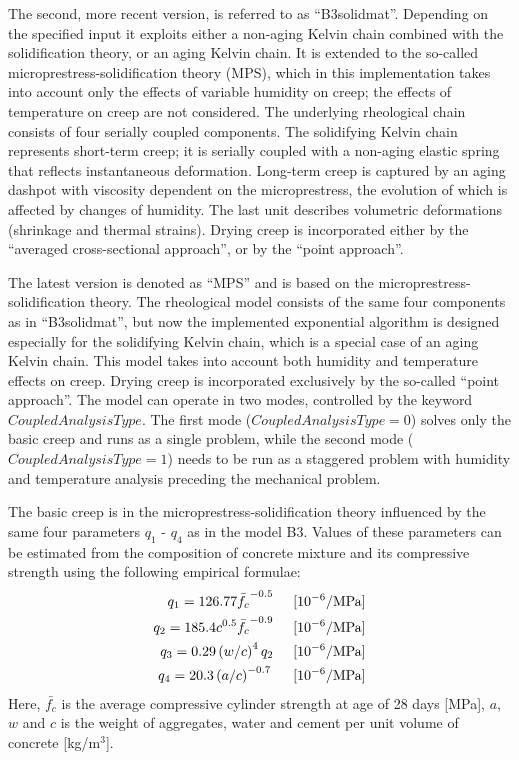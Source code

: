 \documentclass[a4paper]{article}
\begin{document}
The second, more recent version, is referred to as ``B3solidmat''. Depending on the specified input it exploits either a non-aging Kelvin chain combined with the solidification theory, or an aging Kelvin chain. It is extended to the so-called microprestress-solidification theory (MPS), which in this implementation  takes into account only the effects of variable humidity on creep; the effects of temperature on creep are not considered. 
The underlying rheological chain consists of four serially coupled components. The solidifying Kelvin chain represents short-term creep; it is serially coupled with a non-aging elastic spring that reflects instantaneous deformation. Long-term creep is captured by an aging dashpot with viscosity dependent on the microprestress, the evolution of which is affected by changes of humidity. The last  unit describes volumetric deformations (shrinkage and thermal strains).
Drying creep is incorporated either by the 
``averaged cross-sectional approach'', or by the ``point approach''.

The latest version is denoted as ``MPS'' and is based on the microprestress-solidification theory. The rheological model consists of the same four components as in  ``B3solidmat'', but now the implemented exponential algorithm is designed especially for the solidifying Kelvin chain, which is a special case of an aging Kelvin chain. This model takes into account both humidity and temperature effects on creep. Drying creep is incorporated exclusively by the so-called
``point approach''. The model can operate in two modes,
controlled by the keyword $CoupledAnalysisType$. The first mode ($CoupledAnalysisType = 0$) solves only the basic creep and runs as a single problem, while the second mode ($CoupledAnalysisType = 1$) needs to be run as a staggered problem with humidity and temperature analysis preceding the mechanical problem.

The basic creep is in the microprestress-solidification theory influenced by the same four parameters $q_1$ - $q_4$ as in the model B3. Values of these parameters can be estimated from the composition of concrete mixture and its compressive strength using the following empirical formulae: 
\begin{eqnarray}
  q_1 = 126.77 \bar{f_c}^{-0.5} \hspace{5 mm} [10^{-6}/\mbox {MPa}]\\
  q_2 = 185.4 c^{0.5} \bar{f_c}^{-0.9} \hspace{5 mm} [10^{-6}/\mbox {MPa}]\\
  q_3 = 0.29 \left(w/c\right)^4 q_2 \hspace{5 mm} [10^{-6}/\mbox {MPa}]\\
  q_4 = 20.3 \left(a/c\right)^{-0.7} \hspace{5 mm} [10^{-6}/\mbox {MPa}]  
\end{eqnarray}
Here, $\bar{f_c}$ is the average compressive cylinder strength at age of 28 days [MPa], $a$, $w$ and $c$ is the weight  of aggregates, water and cement per unit volume of concrete [kg/m$^3$].
\end{document}
